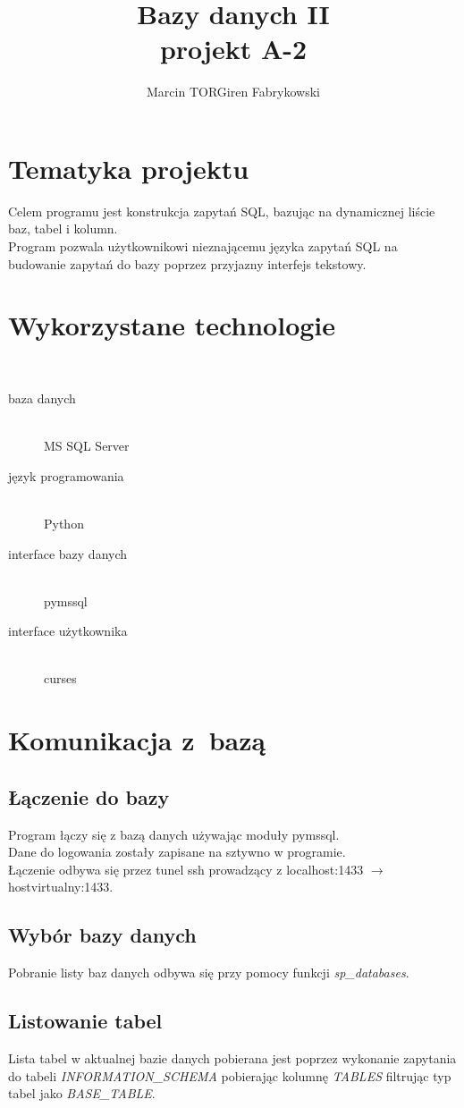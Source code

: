 \documentclass[a4paper,12pt]{article}
\author{Marcin TORGiren Fabrykowski}
\title{Bazy danych II\\ projekt A-2}
\begin{document}
\maketitle
\newpage
\tableofcontents
\newpage
\section{Tematyka projektu}
Celem programu jest konstrukcja zapytań SQL, bazując na dynamicznej liście baz, tabel i kolumn.\\
Program pozwala użytkownikowi nieznającemu języka zapytań SQL na budowanie zapytań do bazy poprzez przyjazny interfejs tekstowy.
\section{Wykorzystane technologie}\
\begin{description}
\item[baza danych]\hfill \\
	MS SQL Server
\item[język programowania]\hfill \\
	Python
\item[interface bazy danych]\hfill \\
	pymssql	
\item[interface użytkownika]\hfill \\
	curses
\end{description}
\section{Komunikacja z~bazą}
\subsection{Łączenie do bazy}
Program łączy się z bazą danych używając moduły pymssql.\\
Dane do logowania zostały zapisane na sztywno w programie.\\
Łączenie odbywa się przez tunel ssh prowadzący z localhost:1433 $\rightarrow$ hostvirtualny:1433.\\
\subsection{Wybór bazy danych}
Pobranie listy baz danych odbywa się przy pomocy funkcji \textit{sp\_databases}.\\
\subsection{Listowanie tabel}
Lista tabel w aktualnej bazie danych pobierana jest poprzez wykonanie zapytania do tabeli \textit{INFORMATION\_SCHEMA} pobierając kolumnę \textit{TABLES} filtrując typ tabel jako \textit{BASE\_TABLE}.
\end{document}
